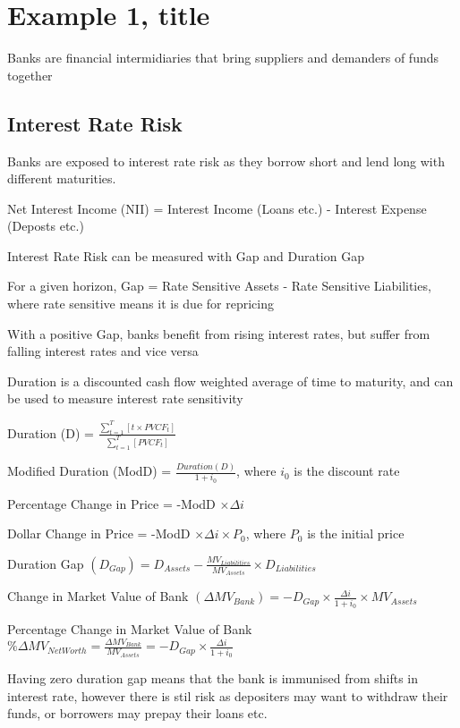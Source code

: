 \section{Example 1, title}
Banks are financial intermidiaries that bring suppliers and demanders of funds
together

\subsection{Interest Rate Risk}
Banks are exposed to interest rate risk as they borrow short and lend long with different maturities.

Net Interest Income (NII) = Interest Income (Loans etc.) - Interest Expense (Deposts etc.)

Interest Rate Risk can be measured with Gap and Duration Gap

For a given horizon, Gap = Rate Sensitive Assets - Rate Sensitive Liabilities, where rate sensitive means it is due for repricing

With a positive Gap, banks benefit from rising interest rates, but suffer from falling interest rates and vice versa

Duration is a discounted cash flow weighted average  of time to maturity, and can be used to measure interest rate sensitivity

Duration (D) = $\frac{\sum^{T}_{t=1}{[t \times PVCF_t]}}{\sum^{T}_{t=1}{[PVCF_t]}}$

Modified Duration (ModD) = $\frac{Duration (D)}{1 + i_0}$, where $i_0$ is the discount rate

Percentage Change in Price = -ModD $\times \Delta i$

Dollar Change in Price = -ModD $\times \Delta i \times P_0$, where $P_0$ is the initial price

Duration Gap $(D_{Gap}) = D_{Assets} - \frac{MV_{Liabilities}}{MV_{Assets}} \times D_{Liabilities}$

Change in Market Value of Bank $(\Delta MV_{Bank}) = -D_{Gap} \times \frac{\Delta i}{1 + i_0} \times MV_{Assets}$

Percentage Change in Market Value of Bank $\%\Delta MV_{Net Worth} = \frac{\Delta MV_{Bank}}{MV_{Assets}} = -D_{Gap} \times \frac{\Delta i}{1 + i_0}$

Having zero duration gap means that the bank is immunised from shifts in interest rate, however there is stil risk as depositers may want to 
withdraw their funds, or borrowers may prepay their loans etc.

